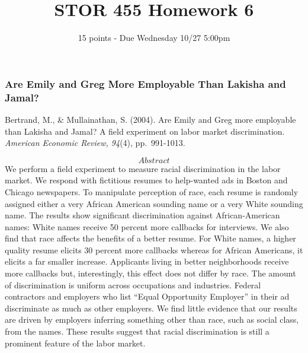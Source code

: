 \documentclass[
]{article}
\title{STOR 455 Homework 6}
\subtitle{15 points - Due Wednesday 10/27 5:00pm}
\author{}
\date{\vspace{-2.5em}}
\begin{document}
\maketitle

\hypertarget{are-emily-and-greg-more-employable-than-lakisha-and-jamal}{%
\subsubsection{Are Emily and Greg More Employable Than Lakisha and
Jamal?}\label{are-emily-and-greg-more-employable-than-lakisha-and-jamal}}

Bertrand, M., \& Mullainathan, S. (2004). Are Emily and Greg more
employable than Lakisha and Jamal? A field experiment on labor market
discrimination. \emph{American Economic Review, 94}(4), pp.~991-1013.

\[Abstract\] We perform a field experiment to measure racial
discrimination in the labor market. We respond with fictitious resumes
to help-wanted ads in Boston and Chicago newspapers. To manipulate
perception of race, each resume is randomly assigned either a very
African American sounding name or a very White sounding name. The
results show significant discrimination against African-American names:
White names receive 50 percent more callbacks for interviews. We also
find that race affects the benefits of a better resume. For White names,
a higher quality resume elicits 30 percent more callbacks whereas for
African Americans, it elicits a far smaller increase. Applicants living
in better neighborhoods receive more callbacks but, interestingly, this
effect does not differ by race. The amount of discrimination is uniform
across occupations and industries. Federal contractors and employers who
list ``Equal Opportunity Employer'' in their ad discriminate as much as
other employers. We find little evidence that our results are driven by
employers inferring something other than race, such as social class,
from the names. These results suggest that racial discrimination is
still a prominent feature of the labor market.
\end{document}
